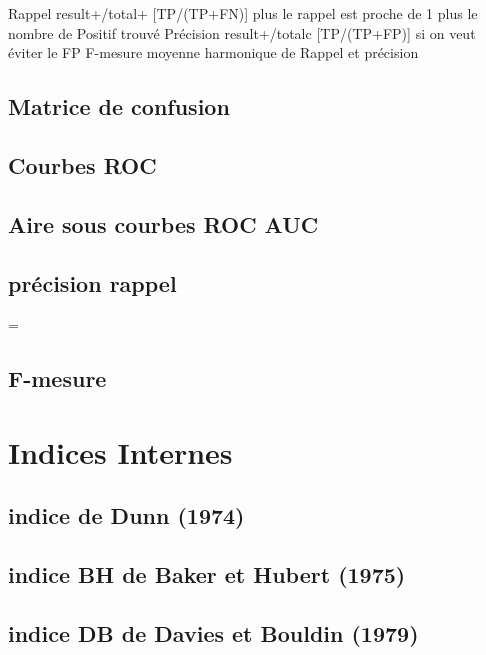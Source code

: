 Rappel result+/total+ {[}TP/(TP+FN){]} plus le rappel est proche de 1
plus le nombre de Positif trouvé Précision result+/totalc
{[}TP/(TP+FP){]} si on veut éviter le FP F-mesure moyenne harmonique de
Rappel et précision

\subsection{Matrice de confusion}\label{matrice-de-confusion}

\subsection{Courbes ROC}\label{courbes-roc}

\subsection{Aire sous courbes ROC
AUC}\label{aire-sous-courbes-roc-auc}

\subsection{précision rappel}\label{pruxe9cision-rappel}

=

\subsection{F-mesure}\label{f-mesure}

\section{Indices Internes}\label{indices-internes}

\subsection{indice de Dunn (1974)}\label{indice-de-dunn-1974}

\subsection{indice BH de Baker et Hubert
(1975)}\label{indice-bh-de-baker-et-hubert-1975}

\subsection{indice DB de Davies et Bouldin
(1979)}\label{indice-db-de-davies-et-bouldin-1979}

